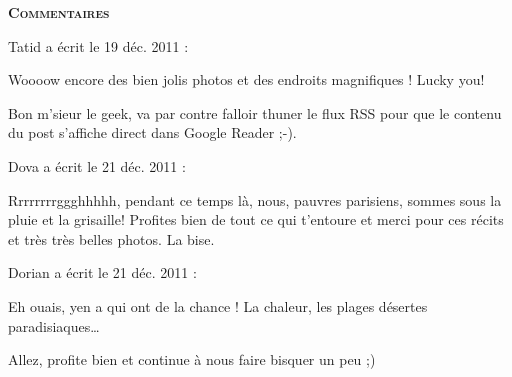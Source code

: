 \bigskip
\textbf{\textsc{Commentaires}}

\medskip
Tatid a écrit le 19 déc. 2011 :
\begin{displayquote}
Woooow encore des bien jolis photos et des endroits magnifiques ! Lucky you!

Bon m'sieur le geek, va par contre falloir thuner le flux RSS pour que le contenu du post s'affiche direct dans Google Reader ;-).
\end{displayquote}

\medskip
Dova a écrit le 21 déc. 2011 :
\begin{displayquote}
Rrrrrrrrggghhhhh, pendant ce temps là, nous, pauvres parisiens, sommes sous la pluie et la grisaille!
Profites bien de tout ce qui t'entoure et merci pour ces récits et très très belles photos.
La bise.
\end{displayquote}

\medskip
Dorian a écrit le 21 déc. 2011 :
\begin{displayquote}
Eh ouais, yen a qui ont de la chance ! La chaleur, les plages désertes paradisiaques\dots

Allez, profite bien et continue à nous faire bisquer un peu ;)
\end{displayquote}

\vfill
